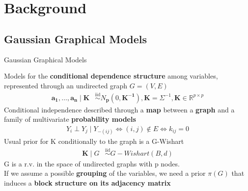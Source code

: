 

\section{Background}
\newcommand{\iid}{\overset{\mathrm{iid}}{\sim}}
\newcommand{\ind}{\overset{\mathrm{ind}}{\sim}}

\subsection{Gaussian Graphical Models}
\begin{frame}{Gaussian Graphical Models}

    Models for the \textbf{conditional dependence structure} among variables, represented through an undirected graph $G=(V,E)$
    \begin{align*}
    \mathbf{a_{1}}, \ldots, \mathbf{a_{n}} \mid \mathbf{K} &\iid N_\mathbf{{p}}(0,\mathbf{K^{-1}}), \mathbf{K}=\Sigma^{-1}, \mathbf{K} \in \mathbb{R}^{p\times p}  %
    \end{align*}
Conditional independence described through a \textbf{map} between a \textbf{graph} and a family of multivariate \textbf{probability models}
\begin{align*}
Y_{i}\perp Y_{j} \mid Y_{-(ij)}\Leftrightarrow (i,j) \notin E \Leftrightarrow k_{ij}=0
\end{align*}
Usual prior for K conditionally to the graph is a G-Wishart
\centering
\begin{align*}
    \mathbf{K} \mid G &\iid G-Wishart(B,d)
\end{align*}
G is a r.v. in the space of undirected graphs with p nodes.\\
If we assume a possible \textbf{grouping} of the variables, we need a prior $\pi(G)$ that induces a \textbf{block structure on its adjacency matrix}

\end{frame}



 



